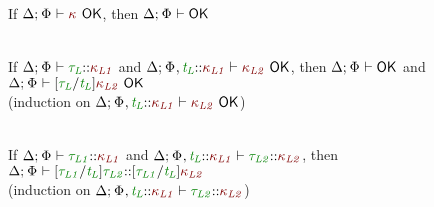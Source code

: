 \documentclass[11pt]{article}
\begin{document}
    \begin{lemma}[OK-KWF]
        If $\KindWellFormed$, then $\ContextWellFormed$
    \end{lemma}
    \begin{lemma}[OK-Substitution]
        \vphantom{.}\\ If $\WellFormedAtKind{\typ[L]}[\knd[L1]]$ and $\KindWellFormed[{\knd[L2]}][\HoleCtx\ExtendTypVarCtx[][L][{\knd[L1]}]]$, then $\ContextWellFormed$ and $\KindWellFormed[\subst{\typ[L]}{\typvar[L]}{\knd[L2]}]$ \\
        (induction on $\KindWellFormed[{\knd[L2]}][\HoleCtx\ExtendTypVarCtx[][L][{\knd[L1]}]]$)
    \end{lemma}
    \begin{lemma}[K-Substitution]
        \vphantom{.}\\ If $\WellFormedAtKind{\typ[L1]}[\knd[L1]]$ and $\WellFormedAtKind[\HoleCtx\ExtendTypVarCtx[][L][{\knd[L1]}]]{\typ[L2]}[\knd[L2]]$, then $\WellFormedAtKind{\subst{\typ[L1]}{\typvar[L]}{\typ[L2]}}[\subst{\typ[L1]}{\typvar[L]}{\knd[L2]}]$ \\
        (induction on $\WellFormedAtKind[\HoleCtx\ExtendTypVarCtx[][L][{\knd[L1]}]]{\typ[L2]}[\knd[L2]]$)
    \end{lemma}
\end{document}
